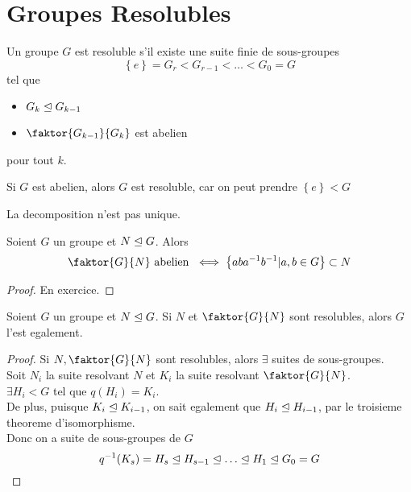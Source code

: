 \documentclass[../main.tex]{subfiles}
\begin{document}
\section{Groupes Resolubles}
\begin{defn}
	Un groupe $G$ est resoluble s'il existe une suite finie de sous-groupes 
	\[ 
	\left\{ e   \right\} = G_r < G_{r-1} < \ldots < G_0= G
	\]
	tel que
	\begin{itemize}
	\item $G_k\trianglelefteq G_{k-1} $ 
	\item $ \faktor{G_{k-1} }{G_k}$ est abelien 
	\end{itemize}
	pour tout $k$.
\end{defn}
\begin{rmq}
Si $G$ est abelien, alors $G$ est resoluble, car on peut prendre $ \left\{ e   \right\} < G$ 
\end{rmq}
\begin{rmq}
La decomposition n'est pas unique.
\end{rmq}
\begin{lemma}
Soient $G$ un groupe et $ N \trianglelefteq G$. Alors
\[ 
\faktor{G}{N} \text{ abelien } \iff \left\{ aba^{-1}b^{-1}| a,b \in G \right\} \subset N
\]

\end{lemma}
\begin{proof}
En exercice.
\end{proof}
\begin{propo}
Soient $G$ un groupe et $N \trianglelefteq G$. Si $ N$ et $ \faktor{G}{N}$ sont resolubles, alors $G$ l'est egalement. 
\end{propo}
\begin{proof}
Si $N, \faktor{G}{N}$ sont resolubles, alors $\exists $ suites de sous-groupes.\\
Soit $N_i$ la suite resolvant $N$ et $ K_i$ la suite resolvant $ \faktor{G}{N}$.\\
$\exists H_i< G $ tel que $q( H_i) = K_i$.\\
De plus, puisque $K_i \trianglelefteq K_{i-1} $, on sait egalement que $H_i \trianglelefteq H_{i-1}$, par le troisieme theoreme d'isomorphisme.\\
Donc on a suite de sous-groupes de $G$ 
\[ 
	q^{-1}( K_s) = H_s \trianglelefteq H_{s-1} \trianglelefteq \ldots \trianglelefteq H_1 \trianglelefteq G_0=G
\]

\end{proof}
\end{document}
